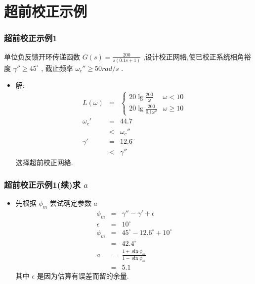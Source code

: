 \documentclass[table]{beamer}
\begin{document}
\section{超前校正示例}
\label{sec-2}
\begin{frame}
\frametitle{超前校正示例1}
\label{sec-2-1}

单位负反馈开环传递函数  $G(s)=\frac{200}{s(0.1s+1)}$ ,设计校正网絡,使已校正系统相角裕度  $\gamma''\geq 45^{\circ}$ , 截止频率  $\omega_c''\geq 50 rad/s$  .

\begin{itemize}
\item <2->解:
      \begin{eqnarray*}
       L(\omega) & = &\begin{cases} 20\lg\frac{200}{\omega} & \omega < 10 \\
      20\lg\frac{200}{0.1\omega^2} & \omega\geq 10
      \end{cases} \\
      \omega_c' &=& 44.7 \\
        &<& \omega_c'' \\
      \gamma' &=& 12.6^{\circ} \\
       &<& \gamma''
      \end{eqnarray*}
      选择超前校正网絡.
\end{itemize}
\end{frame}
\begin{frame}
\frametitle{超前校正示例1(续)求 $a$}
\label{sec-2-2}

\begin{itemize}
\item 先根据 $\phi_m$ 尝试确定参数  $a$ 
      \begin{eqnarray*}
      \phi_m & = &\gamma''-\gamma'+\epsilon \\
      \epsilon &=& 10^{\circ} \\
      \phi_{m} &=& 45^{\circ}-12.6^{\circ}+10^{\circ} \\
       &=& 42.4^{\circ} \\
      a &=& \frac{1+\sin\phi_m}{1-\sin\phi_m} \\
       &=& 5.1
      \end{eqnarray*}
      其中  $\epsilon$  是因为估算有误差而留的余量.
\end{itemize}
\end{frame}
\end{document}
